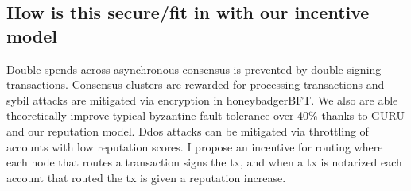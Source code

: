 \documentclass{article}
\begin{document}
\subsection{How is this secure/fit in with our incentive model}
Double spends across asynchronous consensus is prevented by double signing transactions. Consensus clusters are rewarded for processing transactions and sybil attacks are mitigated via encryption in honeybadgerBFT. We also are able theoretically improve typical byzantine fault tolerance over 40\% thanks to GURU and our reputation model. Ddos attacks can be mitigated via throttling of accounts with low reputation scores. I propose an incentive for routing where each node that routes a transaction signs the tx, and when a tx is notarized each account that routed the tx is given a reputation increase.


\end{document}
